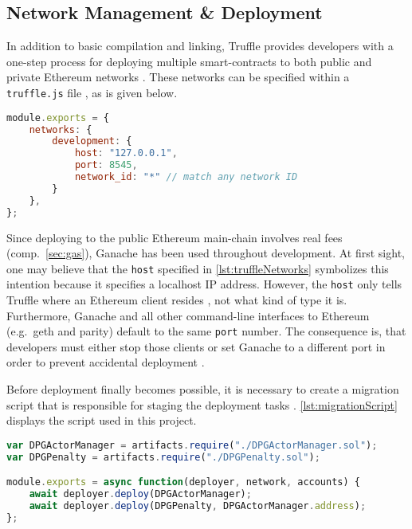 \subsection{Network Management \& Deployment}
In addition to basic compilation and linking, Truffle provides developers with a one-step process for deploying multiple smart-contracts to both public and private Ethereum networks \cite[Truffle Overview]{truffleSuite}. These networks can be specified within a \texttt{truffle.js} file \cite[Configuration]{truffleSuite}, as is given below. 

\begin{lstlisting}[language=JavaScript, caption=Truffle network management, label=lst:truffleNetworks]
module.exports = {
	networks: {
		development: {
			host: "127.0.0.1",
			port: 8545,
			network_id: "*" // match any network ID
		}
	},
};
\end{lstlisting}

Since deploying to the public Ethereum main-chain involves real fees (comp.~\ref{sec:gas}), Ganache has been used throughout development. At first sight, one may believe that the \texttt{host} specified in \autoref{lst:truffleNetworks} symbolizes this intention because it specifies a localhost IP address. However, the \texttt{host} only tells Truffle where an Ethereum client resides \cite[Configuration]{truffleSuite}, not what kind of type it is. Furthermore, Ganache and all other command-line interfaces to Ethereum (e.g.~geth and parity) default to the same \texttt{port} number. The consequence is, that developers must either stop those clients or set Ganache to a different port in order to prevent accidental deployment \cite[Deploying To The Live Network]{truffleSuite}.

Before deployment finally becomes possible, it is necessary to create a migration script that is responsible for staging the deployment tasks \cite[Running Migrations]{truffleSuite}. \autoref{lst:migrationScript} displays the script used in this project.

\begin{lstlisting}[language=JavaScript, caption=Truffle migration script, label=lst:migrationScript]
var DPGActorManager = artifacts.require("./DPGActorManager.sol");
var DPGPenalty = artifacts.require("./DPGPenalty.sol");

module.exports = async function(deployer, network, accounts) {
	await deployer.deploy(DPGActorManager);
	await deployer.deploy(DPGPenalty, DPGActorManager.address);
};
\end{lstlisting}

